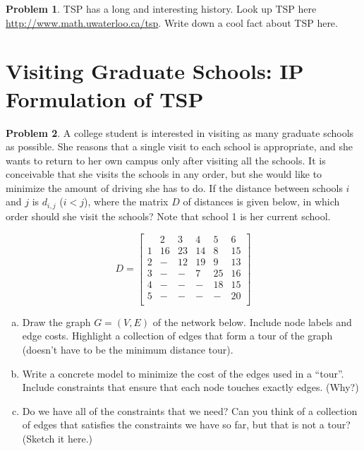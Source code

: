 \documentclass[11pt]{article}
\theoremstyle{definition}
\newtheorem{problem}{Problem}
\newcommand{\answerbox}[3]{%
  \fbox{%
    \begin{minipage}[#1]{#2}
      \hfill\vspace{#3}
    \end{minipage}
  }
}
\newcommand{\answerboxfull}[2]{%
  \answerbox{#1}{6.38in}{#2} 
}
\newcommand{\answerboxone}[2]{%
  \answerbox{#1}{6.0in}{#2} 
}
\newcommand{\catbox}{\answerbox{c}{.5in}{.7cm}}
\begin{document}
\begin{problem}
TSP has a long and interesting history.  Look up TSP here \url{http://www.math.uwaterloo.ca/tsp}.  Write down a cool fact about TSP here.

\answerboxfull{c}{1.3cm}
\end{problem}


\section{Visiting Graduate Schools: IP Formulation of TSP}

\begin{problem}
A college student is interested in visiting as many graduate schools as possible.
She reasons that a single visit to each school is appropriate, and she wants to 
return to her own campus only after visiting all the schools.  It is conceivable that
she visits the schools in any order, but she would like to minimize the amount of
driving she has to do.  If the distance between schools $i$ and $j$ is $d_{i,j}$ ($i < j$), where the 
matrix $D$ of distances is given below, in which order should she visit the schools?
Note that school 1 is her current school.

\[
D = \left[
\begin{array}{c|ccccc}
& 2 & 3 & 4 & 5 & 6 \\
\hline
1 & 16 & 23 & 14 & 8 & 15 \\
2 & - & 12 & 19 & 9 & 13 \\
3 & - & - & 7 & 25 & 16 \\
4 & - & - & - & 18 & 15 \\
5 & - & - & - & - & 20 \\
\end{array}
\right]
\]

\begin{enumerate}[(a)]
\item Draw the graph $G = (V,E)$ of the network below.  Include node labels and edge costs.  Highlight a collection of edges that form a tour of the graph (doesn't have to be the minimum distance tour).

\answerboxone{c}{5cm}


\item Write a concrete model to minimize the cost of the edges used in a ``tour''.  Include constraints that ensure that each node touches exactly \catbox edges.  (Why?)

\answerboxone{c}{6.4cm}

\newpage
\item Do we have all of the constraints that we need?  Can you think of a collection of edges that satisfies the constraints we have so far, but that is not a tour? (Sketch it here.)


\end{enumerate}
\end{problem}
\end{document}
